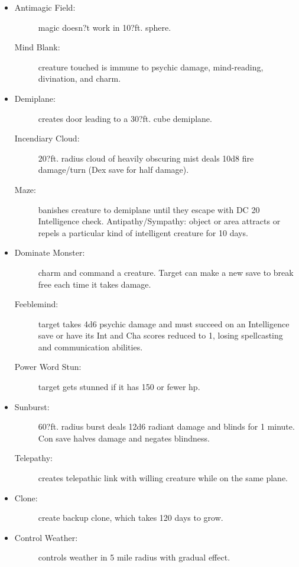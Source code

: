 \documentclass[DIV=14, paper=a4, fontsize=10pt, twocolumn, twoside]{scrartcl}
\begin{document}
\begin{itemize}[align=parleft,labelwidth=1cm]
	\renewcommand{\labelitemi}{Abjur}\item
	\begin{description}
 \item[Antimagic Field:] magic doesn?t work in 10?ft. sphere.
 \item[Mind Blank:] creature touched is immune to psychic damage, mind-reading, divination, and charm.
\end{description}
\renewcommand{\labelitemi}{Conj}\item
\begin{description}
 \item[Demiplane:] creates door leading to a 30?ft. cube demiplane.
 \item[Incendiary Cloud:] 20?ft. radius cloud of heavily obscuring mist deals 10d8 fire damage/turn (Dex save for half damage).
 \item[Maze:] banishes creature to demiplane until they escape with DC 20 Intelligence check. Antipathy/Sympathy: object or area attracts or repels a particular kind of intelligent creature for 10 days.
\end{description}
\renewcommand{\labelitemi}{Ench}\item
\begin{description}
 \item[Dominate Monster:] charm and command a creature. Target can make a new save to break free each time it takes damage.
 \item[Feeblemind:] target takes 4d6 psychic damage and must succeed on an Intelligence save or have its Int and Cha scores reduced to 1, losing spellcasting and communication abilities.
 \item[Power Word Stun:] target gets stunned if it has 150 or fewer hp.
\end{description}
\renewcommand{\labelitemi}{Evoc}\item
\begin{description}
 \item[Sunburst:] 60?ft. radius burst deals 12d6 radiant damage and blinds for 1 minute. Con save halves damage and negates blindness.
 \item[Telepathy:] creates telepathic link with willing creature while on the same plane.
\end{description}
\renewcommand{\labelitemi}{Necro}\item
\begin{description}
 \item[Clone:] create backup clone, which takes 120 days to grow.
\end{description}
\renewcommand{\labelitemi}{Trans}\item
\begin{description}
 \item[Control Weather:] controls weather in 5 mile radius with gradual effect.
\end{description}
\end{itemize}
\end{document}
